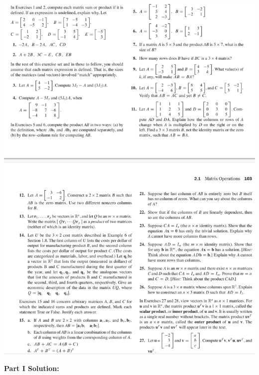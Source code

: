 \documentclass[a4paper,11pt,reqno]{amsart}
\numberwithin{equation}{section}
\begin{document}
\includegraphics[width=\textwidth, height=1.35\textwidth]{exercises/mo_1.png}

\newpage

\textbf{Part I Solution:}
\end{document}
